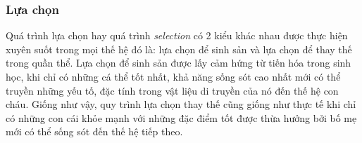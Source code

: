  \subsubsection{Lựa chọn}
 Quá trình lựa chọn hay quá trình \emph{selection} có 2 kiểu khác nhau được thực hiện xuyên suốt trong mọi thế hệ đó là: lựa chọn để sinh sản và lựa chọn để thay thế trong quần thể. Lựa chọn để sinh sản được lấy cảm hứng từ tiến hóa trong sinh học, khi chỉ có những cá thể tốt nhất, khả năng sống sót cao nhất mới có thể truyền những yếu tố, đặc tính trong vật liệu di truyền của nó đến thế hệ con cháu. Giống như vậy, quy trình lựa chọn thay thế cũng giống như thực tế khi chỉ có những con cái khỏe mạnh với những đặc điểm tốt được thừa hưởng bởi bố mẹ mới có thể sống sót đến thế hệ tiếp theo. 
 

